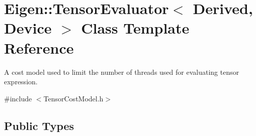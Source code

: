 \hypertarget{struct_eigen_1_1_tensor_evaluator}{}\section{Eigen\+:\+:Tensor\+Evaluator$<$ Derived, Device $>$ Class Template Reference}
\label{struct_eigen_1_1_tensor_evaluator}


A cost model used to limit the number of threads used for evaluating tensor expression.  




{\ttfamily \#include $<$Tensor\+Cost\+Model.\+h$>$}

\subsection*{Public Types}
